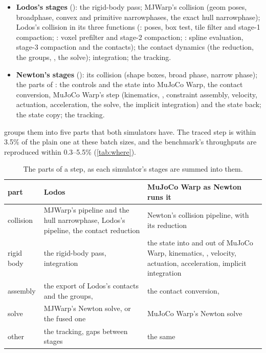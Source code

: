 \begin{itemize}
\item \textbf{Lodos's stages} (): the rigid-body pass; MJWarp's collision (geom poses, broadphase, convex and primitive narrowphases, the exact hull narrowphase); Lodos's collision in its three functions (: poses, box test, tile filter and stage-1 compaction; : voxel prefilter and stage-2 compaction; : spline evaluation, stage-3 compaction and the contacts); the contact dynamics (the reduction, the groups, , the solve); integration; the tracking.
\item \textbf{Newton's stages} (): its collision (shape boxes, broad phase, narrow phase); the parts of : the controls and the state into MuJoCo Warp, the contact conversion, MuJoCo Warp's step (kinematics, , constraint assembly, velocity, actuation, acceleration, the solve, the implicit integration) and the state back; the state copy; the tracking.
\end{itemize}

 groups them into five parts that both simulators have. The traced step is within 3.5\% of the plain one at these batch sizes, and the benchmark's throughputs are reproduced within 0.3--5.5\% (\cref{tab:where}).

\begin{table}[t]
\centering
\caption{The parts of a step, as each simulator's stages are summed into them.}
\label{tab:categories}
\small
\begin{tabularx}{\linewidth}{@{}L{22mm}YY@{}}
\toprule
part & Lodos & MuJoCo Warp as Newton runs it \\
\midrule
collision & MJWarp's pipeline and the hull narrowphase, Lodos's pipeline, the contact reduction & Newton's collision pipeline, with its reduction \\
rigid body & the rigid-body pass, integration & the state into and out of MuJoCo Warp, kinematics, , velocity, actuation, acceleration, implicit integration \\
assembly & the export of Lodos's contacts and the groups,  & the contact conversion,  \\
solve & MJWarp's Newton solve, or the fused one & MuJoCo Warp's Newton solve \\
other & the tracking, gaps between stages & the same \\
\bottomrule
\end{tabularx}
\end{table}


